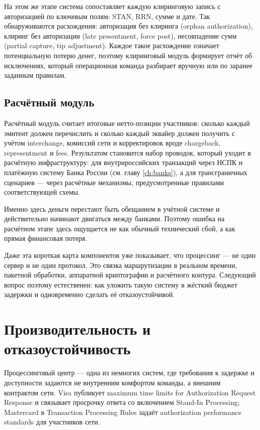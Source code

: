 На этом же этапе система сопоставляет каждую клиринговую
запись с авторизацией по ключевым полям: STAN, RRN, сумме
и дате. Так обнаруживаются расхождения: авторизация без
клиринга (orphan authorization), клиринг без авторизации
(late presentment, force post), несовпадение сумм
(partial capture, tip adjustment). Каждое такое расхождение
означает потенциальную потерю денег, поэтому клиринговый модуль
формирует отчёт об исключениях, который операционная команда
разбирает вручную или по заранее заданным правилам.

\subsection*{Расчётный модуль}

Расчётный модуль считает итоговые нетто-позиции участников:
сколько каждый эмитент должен перечислить и сколько каждый
эквайер должен получить с учётом interchange, комиссий сети
и корректировок вроде chargeback, representment и fees.
Результатом становится набор проводок, который уходит
в расчётную инфраструктуру: для внутрироссийских транзакций
через НСПК и платёжную систему Банка России
(см. главу \ref{ch:banks}), а для трансграничных сценариев —
через расчётные механизмы, предусмотренные правилами
соответствующей схемы.~\cite{cbr-national-payment-system,cbr-ps,visa-core-rules,mc-switching-services}

Именно здесь деньги перестают быть обещанием в учётной
системе и действительно начинают двигаться между банками.
Поэтому ошибка на расчётном этапе здесь ощущается не как обычный
технический сбой, а как прямая финансовая потеря.

Даже эта короткая карта компонентов уже показывает,
что процессинг — не один сервер и не один протокол.
Это связка маршрутизации в реальном времени, пакетной
обработки, аппаратной криптографии и расчётного контура.
Следующий вопрос поэтому естественен: как уложить такую
систему в жёсткий бюджет задержки и одновременно сделать
её отказоустойчивой.

\section{Производительность и отказоустойчивость}
\label{sec:pc-performance}

Процессинговый центр — одна из немногих систем, где требования
к задержке и доступности задаются не внутренним комфортом команды,
а внешним контрактом сети. Visa публикует maximum time limits
for Authorization Request Response и связывает просрочку
ответа со включением Stand-In Processing; Mastercard
в Transaction Processing Rules задаёт authorization
performance standards для участников сети.~\cite{visa-core-rules,mc-tpr}

